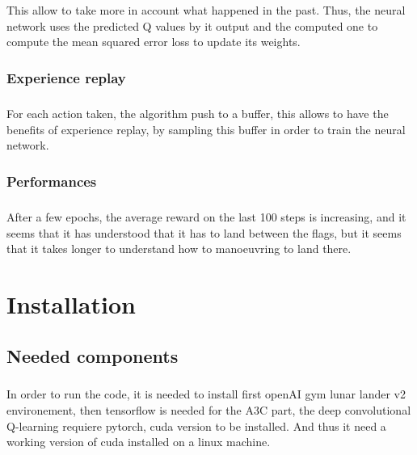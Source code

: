 \documentclass[14pt,a4paper,oneside]{report}
\begin{document}
This allow to take more in account what happened in the past. Thus, the neural network uses the predicted Q values by it output and the computed one to compute the mean squared error loss  to update its weights. 

\subsection{Experience replay}
\paragraph{} For each action taken, the algorithm push to a buffer, this allows to have the benefits of experience replay, by sampling this buffer in order to train the neural network. 
\subsection{Performances}
\paragraph{} After a few epochs, the average reward on the last 100 steps is increasing, and it seems that it has understood that it has to land between the flags, but it seems that it takes longer to understand how to manoeuvring to land there. 
\appendix
\chapter{Installation}
\section{Needed components}
\paragraph{} In order to run the code, it is needed to install first openAI gym lunar lander v2 environement, then tensorflow is needed for the A3C part, the deep convolutional Q-learning requiere pytorch, cuda version to be installed. And thus it need a working version of cuda installed on a linux machine. 
\end{document}
